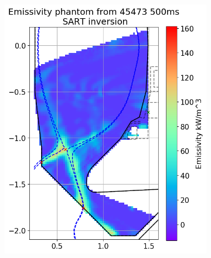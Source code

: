 \begin{figure}
     \begin{subfigure}{0.45\linewidth}
         \centering
         \includegraphics[trim={0 0 0 43},clip,width=\textwidth]{Chapters/chapter2/figs/inversion_comparison_emissivity_pantom_test-SART.png}
         \caption{}
         \label{fig:self_phantom1a}
     \end{subfigure}
     \hfill
     \begin{subfigure}{0.45\linewidth}
         \centering

\end{subfigure}
\end{figure}
